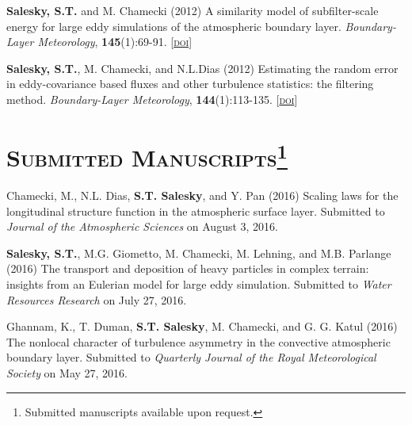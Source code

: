 \documentclass[11pt,letterpaper]{article}
\begin{document}
\textbf{Salesky, S.T.} and M. Chamecki  (2012) A similarity model of subfilter-scale energy for large eddy simulations of the atmospheric boundary layer. \textit{Boundary-Layer Meteorology}, \textbf{145}(1):69-91. [\href{http://doi.org/10.1007/s10546-011-9618-0}{\textsc{doi}}]

\textbf{Salesky, S.T.}, M. Chamecki, and N.L.Dias (2012) Estimating the random error in eddy-covariance based fluxes and other turbulence statistics: the filtering method. \textit{Boundary-Layer Meteorology}, \textbf{144}(1):113-135. [\href{http://doi.org/10.1007/s10546-012-9710-0}{\textsc{doi}}]


\section*{\textsc{Submitted Manuscripts}\footnote[2]{Submitted manuscripts available upon request.}}

Chamecki, M., N.L. Dias, \textbf{S.T. Salesky}, and Y. Pan (2016) Scaling laws
for the longitudinal structure function in the atmospheric surface layer.
Submitted to \textit{Journal of the Atmospheric Sciences} on August 3, 2016.

\textbf{Salesky, S.T.}, M.G. Giometto, M. Chamecki, M. Lehning, and M.B.
Parlange (2016) The transport and deposition of heavy particles in complex
terrain: insights from an Eulerian model for large eddy simulation. Submitted
to \textit{Water Resources Research} on July 27, 2016.

Ghannam, K., T. Duman, \textbf{S.T. Salesky}, M. Chamecki, and G. G. Katul
(2016) The nonlocal character of turbulence asymmetry in the convective
atmospheric boundary layer. Submitted to \textit{Quarterly Journal of the Royal
  Meteorological Society} on May 27, 2016.
\end{document}
